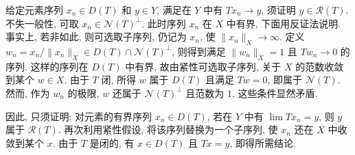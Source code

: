\begin{Proof}
{给定元素序列 $x_n\in D(T)$ 和 $y\in Y$, 满足在 $Y$ 中有 $Tx_n\to y$, 须证明 $y\in\mathcal R(T)$. 不失一般性, 可取 $x_n\in\mathcal N(T)^\perp$. 此时序列 $x_n$ 在 $X$ 中有界, 下面用反证法说明. 事实上, 若非如此, 则可选取子序列, 仍记为 $x_n$, 使 $\|x_n\|_X\to\infty$. 定义 $w_n=x_n/\|x_n\|_X\in D(T)\cap\mathcal N(T)^\perp$, 则得到满足 $\|w_n\|_X=1$ 且 $Tw_n\to0$ 的序列. 这样的序列在 $D(T)$ 中有界, 故由紧性可选取子序列, 关于 $X$ 的范数收敛到某个 $w\in X$. 由于 $T$ 闭, 所得 $w$ 属于 $D(T)$ 且满足 $Tw=0$, 即属于 $\mathcal N(T)$. 然而, 作为 $w_n$ 的极限, $w$ 还属于 $\mathcal N(T)^\perp$ 且范数为 $1$. 这些条件显然矛盾.}

{因此, 只须证明: 对元素的有界序列 $x_n\in D(T)$, 若在 $Y$ 中有 $\lim Tx_n=y$, 则 $y$ 属于 $\mathcal R(T)$. 再次利用紧性假设, 将该序列替换为一个子序列, 使 $x_n$ 还在 $X$ 中收敛到某个 $x$. 由于 $T$ 是闭的, 有 $x\in D(T)$ 且 $Tx=y$, 即得所需结论.}
\end{Proof}
